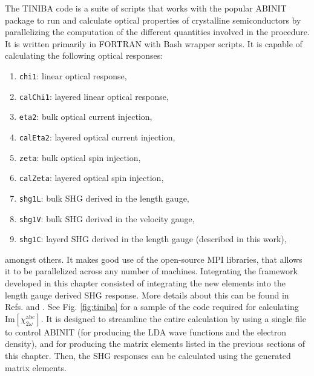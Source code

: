 The TINIBA code is a suite of scripts that works with the popular
ABINIT\cite{gonzeCPS09} package to run and calculate optical properties of
crystalline semiconductors by parallelizing the computation of the different
quantities involved in the procedure. It is written primarily in FORTRAN with
Bash wrapper scripts. It is capable of calculating the following optical
responses:
\begin{enumerate}
\item \verb|chi1|: linear optical response,
\item \verb|calChi1|: layered linear optical response,
\item \verb|eta2|: bulk optical current injection,
\item \verb|calEta2|: layered optical current injection,
\item \verb|zeta|: bulk optical spin injection,
\item \verb|calZeta|: layered optical spin injection,
\item \verb|shg1L|: bulk SHG derived in the length gauge,
\item \verb|shg1V|: bulk SHG derived in the velocity gauge,
\item \verb|shg1C|: layerd SHG derived in the length gauge
                    (described in this work),
\end{enumerate}
amongst others. It makes good use of the open-source MPI libraries, that allows
it to be parallelized across any number of machines. Integrating the framework
developed in this chapter consisted of integrating the new elements into the
length gauge derived SHG response. More details about this can be found in Refs.
\cite{cabellosPRB09} and \cite{andersonPRB15}. See Fig. \ref{fig:tiniba} for a
sample of the code required for calculating
$\mathrm{Im}[\chi^{\mathrm{a}\mathrm{b}\mathrm{c}}_{2\omega}]$. It is designed
to streamline the entire calculation by using a single file to control ABINIT
(for producing the LDA wave functions and the electron density), and for
producing the matrix elements listed in the previous sections of this chapter.
Then, the SHG responses can be calculated using the generated matrix elements.

